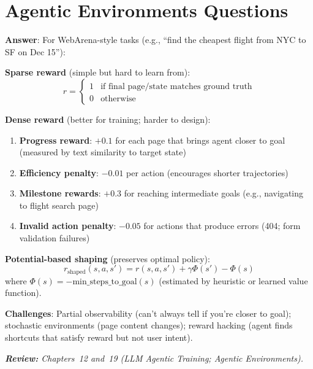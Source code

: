 \section{Agentic Environments Questions}
\label{agentic-environments-questions}

\begin{questionbox}
\textbf{Answer}: For WebArena-style tasks (e.g., ``find the cheapest flight from NYC to SF on Dec 15''):

\textbf{Sparse reward} (simple but hard to learn from): 
\[
r = \begin{cases} 1 & \text{if final page/state matches ground truth} \\ 0 & \text{otherwise} \end{cases}
\]

\textbf{Dense reward} (better for training; harder to design):

\begin{enumerate}
  \item \textbf{Progress reward}: $+0.1$ for each page that brings agent closer to goal (measured by text similarity to target state)
  \item \textbf{Efficiency penalty}: $-0.01$ per action (encourages shorter trajectories)
  \item \textbf{Milestone rewards}: $+0.3$ for reaching intermediate goals (e.g., navigating to flight search page)
  \item \textbf{Invalid action penalty}: $-0.05$ for actions that produce errors (404; form validation failures)
\end{enumerate}

\textbf{Potential-based shaping} (preserves optimal policy): 
\[
r_{\text{shaped}}(s, a, s') = r(s, a, s') + \gamma \Phi(s') - \Phi(s)
\]
 where $\Phi(s) = -\text{min\_steps\_to\_goal}(s)$ (estimated by heuristic or learned value function).

\textbf{Challenges}: Partial observability (can’t always tell if you’re closer to goal); stochastic environments (page content changes); reward hacking (agent finds shortcuts that satisfy reward but not user intent).

\emph{\textbf{Review:} Chapters~12 and~19 (LLM Agentic Training; Agentic Environments).}
\end{questionbox}

